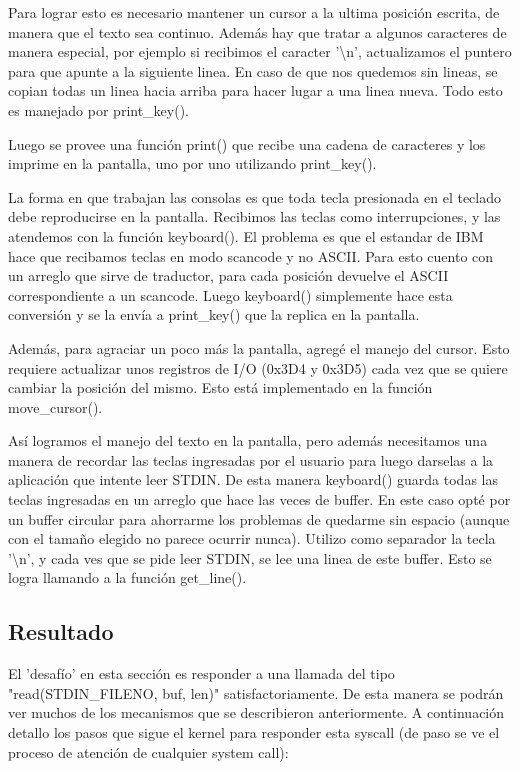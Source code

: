 Para lograr esto es necesario mantener un cursor a la ultima posición escrita,
de manera que el texto sea continuo. Además hay que tratar a algunos caracteres
de manera especial, por ejemplo si recibimos el caracter '\textbackslash n',
actualizamos el puntero para que apunte a la siguiente linea. En caso de que
nos quedemos sin lineas, se copian todas un linea hacia arriba para hacer
lugar a una linea nueva. Todo esto es manejado por print\_key().

Luego se provee una función print() que recibe una cadena de caracteres y los
imprime en la pantalla, uno por uno utilizando print\_key().

La forma en que trabajan las consolas es que toda tecla presionada en el
teclado debe reproducirse en la pantalla. Recibimos las teclas como
interrupciones, y las atendemos con la función keyboard(). El problema es que el
estandar de IBM hace que recibamos teclas en modo scancode y no ASCII. Para
esto cuento con un arreglo que sirve de traductor, para cada posición devuelve
el ASCII correspondiente a un scancode. Luego keyboard() simplemente hace esta
conversión y se la envía a print\_key() que la replica en la pantalla.

Además, para agraciar un poco más la pantalla, agregé el manejo del cursor.
Esto requiere actualizar unos registros de I/O (0x3D4 y 0x3D5) cada vez que se
quiere cambiar la posición del mismo. Esto está implementado en la función
move\_cursor().

Así logramos el manejo del texto en la pantalla, pero además necesitamos una
manera de recordar las teclas ingresadas por el usuario para luego darselas a
la aplicación que intente leer STDIN. De esta manera keyboard() guarda todas
las teclas ingresadas en un arreglo que hace las veces de buffer. En este caso
opté por un buffer circular para ahorrarme los problemas de quedarme sin
espacio (aunque con el tamaño elegido no parece ocurrir nunca). Utilizo como
separador la tecla '\textbackslash n', y cada ves que se pide leer STDIN, se
lee una linea de este buffer. Esto se logra llamando a la función get\_line().

\subsection{Resultado}

El 'desafío' en esta sección es responder a una llamada del tipo
"read(STDIN\_FILENO, buf, len)" satisfactoriamente. De esta manera se podrán
ver muchos de los mecanismos que se describieron anteriormente. A continuación
detallo los pasos que sigue el kernel para responder esta syscall (de paso se
ve el proceso de atención de cualquier system call):

